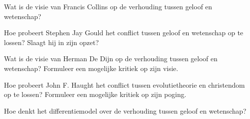 \documentclass[main.tex]{subfiles}
\begin{document}
\begin{examenvraag}
    \begin{vraag}
        Wat is de visie van Francis Collins op de verhouding tussen geloof en wetenschap?
    \end{vraag}

    \begin{antwoord}
    \end{antwoord}
\end{examenvraag}


\begin{examenvraag}
    \begin{vraag}
        Hoe probeert Stephen Jay Gould het conflict tussen geloof en wetenschap op te lossen? Slaagt hij in zijn opzet?
    \end{vraag}

    \begin{antwoord}
    \end{antwoord}
\end{examenvraag}


\begin{examenvraag}
    \begin{vraag}
        Wat is de visie van Herman De Dijn op de verhouding tussen geloof en wetenschap? Formuleer een mogelijke kritiek op zijn visie.
    \end{vraag}

    \begin{antwoord}
    \end{antwoord}
\end{examenvraag}


\begin{examenvraag}
    \begin{vraag}
        Hoe probeert John F. Haught het conflict tussen evolutietheorie en christendom op te lossen? Formuleer een mogelijke kritiek op zijn poging.
    \end{vraag}

    \begin{antwoord}
    \end{antwoord}
\end{examenvraag}


\begin{examenvraag}
    \begin{vraag}
        Hoe denkt het differentiemodel over de verhouding tussen geloof en wetenschap?
    \end{vraag}

    \begin{antwoord}
    \end{antwoord}
\end{examenvraag}
\end{document}
